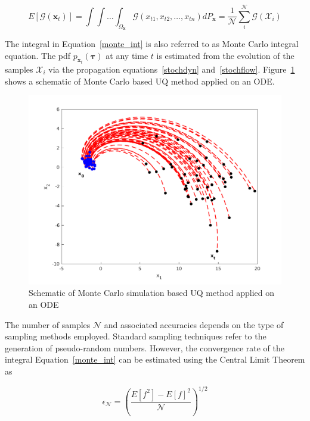 \begin{equation}
\label{monte_int}
E[\mathcal{G}(\textbf{x}_t)] = \int \int \ldots \int_{\Omega_{\textbf{x}}} \mathcal{G}(x_{t1},x_{t2},\ldots,x_{tn}) dP_{\textbf{x}} = \frac{
1}{\mathcal{N}} \sum_i^{\mathcal{N}} \mathcal{G}(\mathcal{X}_i)
\end{equation}

The integral in Equation~\ref{monte_int} is also referred to as Monte Carlo integral equation. The pdf $p_{\textbf{x}_t}(\bm{\tau})$ at any time $t$ is estimated from the evolution of the samples $\mathcal{X}_i$ via the propagation equations~\ref{stochdyn} and~\ref{stochflow}. Figure~\ref{montecarlo} shows a schematic of Monte Carlo based UQ method applied on an ODE. 

\begin{figure}[H]
\begin{center}
\includegraphics[scale=0.5]{figures/montecarlo}
\caption{Schematic of Monte Carlo simulation based UQ method applied on an ODE}
\label{montecarlo}
\end{center}
\end{figure}


The number of samples $\mathcal{N}$ and associated accuracies depends on the type of sampling methods employed. Standard sampling techniques refer to the generation of pseudo-random numbers. However, the convergence rate of the integral Equation~\ref{monte_int} can be estimated using the Central Limit Theorem as~\cite{stroud1971approximate} 

\begin{equation}
\epsilon_{\mathcal{N}} = \left(\frac{E[f^2]- E[f]^2}{\mathcal{N}}\right)^{1/2} 
\end{equation}

